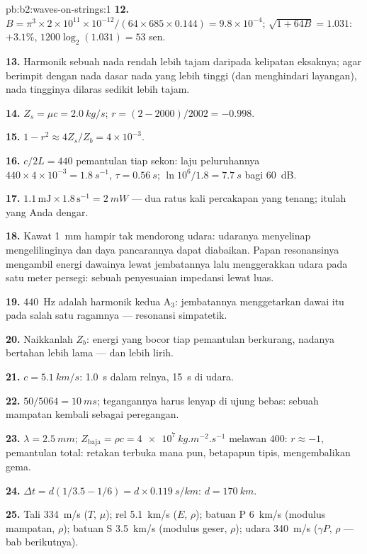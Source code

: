 \begin{solution}{pb:b2:waves-on-strings:1}
\textbf{12.} $B = \pi^3 \times 2 \times 10^{11} \times 10^{-12}/(64 \times 685 \times 0.144) =
9.8 \times 10^{-4}$; $\sqrt{1 + 64B} = 1.031$: $+3.1\%$, $1200\log_2(1.031) = 53$ sen.

\textbf{13.} Harmonik sebuah nada rendah lebih tajam daripada kelipatan
eksaknya; agar berimpit dengan nada dasar nada yang lebih tinggi
(dan menghindari layangan), nada tingginya dilaras sedikit lebih tajam.

\textbf{14.} $Z_s = \mu c = \qty{2.0}{kg/s}$; $r = (2 - 2000)/2002 = -0.998$.

\textbf{15.} $1 - r^2 \approx 4Z_s/Z_b = 4 \times 10^{-3}$.

\textbf{16.} $c/2L = 440$ pemantulan tiap sekon: laju peluruhannya $440 \times 4 \times
10^{-3} = \qty{1.8}{s^{-1}}$, $\tau = \qty{0.56}{s}$; $\ln10^6/1.8 = \qty{7.7}{s}$ bagi
\qty{60}{dB}.

\textbf{17.} $1.1\,\text{mJ} \times 1.8\,\text{s}^{-1} = \qty{2}{mW}$ --- dua ratus
kali percakapan yang tenang; itulah yang Anda dengar.

\textbf{18.} Kawat \qty{1}{mm} hampir tak mendorong udara: udaranya menyelinap mengelilinginya
dan daya pancarannya dapat diabaikan. Papan resonansinya mengambil
energi dawainya lewat jembatannya lalu menggerakkan udara pada satu meter persegi:
sebuah penyesuaian impedansi lewat luas.

\textbf{19.} \qty{440}{Hz} adalah harmonik kedua A$_3$: jembatannya menggetarkan
dawai itu pada salah satu ragamnya --- resonansi simpatetik.

\textbf{20.} Naikkanlah $Z_b$: energi yang bocor tiap pemantulan berkurang, nadanya bertahan
lebih lama --- dan lebih lirih.

\textbf{21.} $c = \qty{5.1}{km/s}$: \qty{1.0}{s} dalam relnya, \qty{15}{s} di udara.

\textbf{22.} $50/5064 = \qty{10}{ms}$; tegangannya harus lenyap di ujung bebas:
sebuah mampatan kembali sebagai peregangan.

\textbf{23.} $\lambda = \qty{2.5}{mm}$; $Z_{\text{baja}} = \rho c = \qty{4e7}{kg.m^{-2}.s^{-1}}$
melawan $400$: $r \approx -1$, pemantulan total: retakan terbuka mana pun, betapapun
tipis, mengembalikan gema.

\textbf{24.} $\Delta t = d(1/3.5 - 1/6) = d \times \qty{0.119}{s/km}$: $d = \qty{170}{km}$.

\textbf{25.} Tali \qty{334}{m/s} ($T$, $\mu$); rel \qty{5.1}{km/s} ($E$, $\rho$);
batuan P \qty{6}{km/s} (modulus mampatan, $\rho$); batuan S \qty{3.5}{km/s}
(modulus geser, $\rho$); udara \qty{340}{m/s} ($\gamma P$, $\rho$ --- bab berikutnya).
\end{solution}
